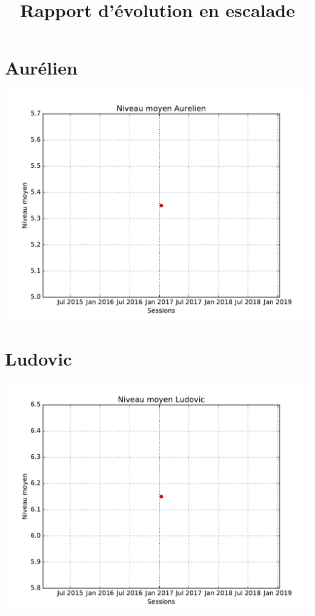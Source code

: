 \documentclass[11pt]{beamer}
\title{Rapport d'évolution en escalade}
\begin{document}
\begin{frame}
\titlepage
\end{frame}


\section{Aurélien}

\begin{frame}
\includegraphics[width=\textwidth]{Aurelien_level_evolution}
\end{frame}

\section{Ludovic}

\begin{frame}
\includegraphics[width=\textwidth]{Ludovic_level_evolution}
\end{frame}
\end{document}
